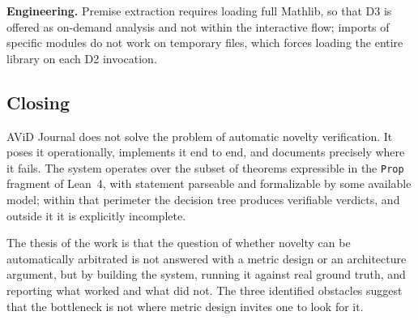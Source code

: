 \textbf{Engineering.} Premise extraction requires loading full Mathlib, so that D3 is offered as on-demand analysis and not within the interactive flow; imports of specific modules do not work on temporary files, which forces loading the entire library on each D2 invocation.

\subsection{Closing}

AViD Journal does not solve the problem of automatic novelty verification. It poses it operationally, implements it end to end, and documents precisely where it fails. The system operates over the subset of theorems expressible in the \texttt{Prop} fragment of Lean~4, with statement parseable and formalizable by some available model; within that perimeter the decision tree produces verifiable verdicts, and outside it it is explicitly incomplete.

The thesis of the work is that the question of whether novelty can be automatically arbitrated is not answered with a metric design or an architecture argument, but by building the system, running it against real ground truth, and reporting what worked and what did not. The three identified obstacles suggest that the bottleneck is not where metric design invites one to look for it.